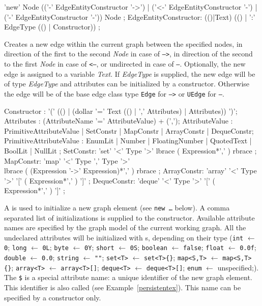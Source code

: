 \begin{rail}
  'new' Node (('-' EdgeEntityConstructor '->') | ('<-' EdgeEntityConstructor '-') | ('-' EdgeEntityConstructor '-')) Node ;
EdgeEntityConstructor:
  (()|Text) (() | ':' EdgeType (() | Constructor)) ;
\end{rail}
Creates a new edge within the current graph between the specified nodes,
in direction of the first to the second \emph{Node} in case of \texttt{-->},
in direction of the second to the first \emph{Node} in case of \texttt{<--},
or undirected in case of \texttt{--}.
Optionally, the new edge is assigned to a variable \emph{Text}.
If \emph{EdgeType} is supplied, the new edge will be of type \emph{EdgeType} and attributes can be initialized by a constructor.
Otherwise the edge will be of the base edge class type \texttt{Edge} for \texttt{-->} or \texttt{UEdge} for \texttt{--}.

\begin{rail}
  Constructor : '(' (() | (dollar '=' Text (() | ',' Attributes) | Attributes)) ')';
  Attributes : (AttributeName '=' AttributeValue) + (',');
  AttributeValue :  PrimitiveAttributeValue | SetConstr | MapConstr | ArrayConstr | DequeConstr;
  PrimitiveAttributeValue : EnumLit | Number | FloatingNumber | QuotedText | BoolLit | NullLit ;
  SetConstr: 'set' '<' Type '>' lbrace ( Expression*',' ) rbrace ;
  MapConstr: 'map' '<' Type ',' Type '>' \\ lbrace ( (Expression '->' Expression)*',' ) rbrace ;
  ArrayConstr: 'array' '<' Type '>' '[' ( Expression*',' ) ']' ;
  DequeConstr: 'deque' '<' Type '>' '[' ( Expression*',' ) ']' ;
\end{rail}\indexmain{\texttt{\$}}
A  is used to initialize a new graph element (see \texttt{new \dots} below).
A comma separated list of  initializations is supplied to the constructor.
Available attribute names are specified by the graph model of the current working graph.
All the undeclared attributes will be initialized with s, depending on their type
(\texttt{int} $\leftarrow$ \texttt{0}; \texttt{long} $\leftarrow$ \texttt{0L}; \texttt{byte} $\leftarrow$ \texttt{0Y}; \texttt{short} $\leftarrow$ \texttt{0S}; \texttt{boolean} $\leftarrow$ \texttt{false}; \texttt{float} $\leftarrow$ \texttt{0.0f}; \texttt{double} $\leftarrow$ \texttt{0.0}; \texttt{string} $\leftarrow$ \texttt{""}; \texttt{set<T>} $\leftarrow$ \texttt{set<T>\{\}}; \texttt{map<S,T>} $\leftarrow$ \texttt{map<S,T>\{\}}; \texttt{array<T>} $\leftarrow$ \texttt{array<T>[]}; \texttt{deque<T>} $\leftarrow$ \texttt{deque<T>[]}; \texttt{enum} $\leftarrow$ unspecified;).\\
The \texttt{\$} is a special attribute name: a unique identifier of the new graph element.
This identifier is also called  (see Example~\ref{persistentex}).
This name can be specified by a constructor only.

